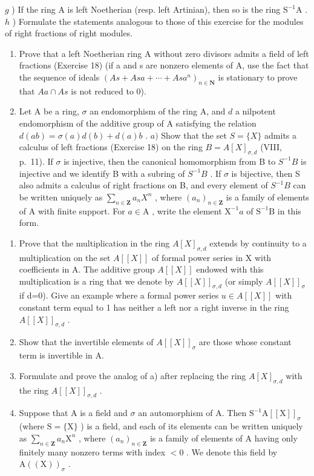 \(g\) ) If the ring A is left Noetherian (resp. left Artinian), then so is the ring \(\mathrm{S}^{-1}\mathrm{A}\) . \(h\) ) Formulate the statements analogous to those of this exercise for the modules of right fractions of right modules.

\begin{enumerate}
\def\labelenumi{\arabic{enumi})}
\setcounter{enumi}{19}
\item
  Prove that a left Noetherian ring A without zero divisors admits a field of left fractions (Exercise 18) (if a and s are nonzero elements of A, use the fact that the sequence of ideals \((As + Asa + \cdots + Asa^{n})_{n \in \mathbf{N}}\) is stationary to prove that \(Aa \cap As\) is not reduced to 0).
\item
  Let A be a ring, \(\sigma\) an endomorphism of the ring A, and \(d\) a nilpotent endomorphism of the additive group of A satisfying the relation \(d(ab) = \sigma(a)d(b) + d(a)b\) . \(a)\) Show that the set \(S = \{X\}\) admits a calculus of left fractions (Exercise 18) on the ring \(B = A[X]_{\sigma,d}\) (VIII, p.~11). If \(\sigma\) is injective, then the canonical homomorphism from B to \(S^{-1}B\) is injective and we identify B with a subring of \(S^{-1}B\) . If \(\sigma\) is bijective, then S also admits a calculus of right fractions on B, and every element of \(S^{-1}B\) can be written uniquely as \(\sum_{n\in\mathbf{Z}}a_nX^n\) , where \((a_n)_{n\in\mathbf{Z}}\) is a family of elements of A with finite support. For \(a \in \mathrm{A}\) , write the element \(\mathrm{X}^{-1}a\) of \(\mathrm{S}^{-1}\mathrm{B}\) in this form.
\end{enumerate}

\begin{enumerate}
\def\labelenumi{\alph{enumi})}
\setcounter{enumi}{1}
\item
  Prove that the multiplication in the ring \(A[X]_{\sigma,d}\) extends by continuity to a multiplication on the set \(A[[X]]\) of formal power series in X with coefficients in A. The additive group \(A[[X]]\) endowed with this multiplication is a ring that we denote by \(A[[X]]_{\sigma,d}\) (or simply \(A[[X]]_{\sigma}\) if d=0). Give an example where a formal power series \(u\in A[[X]]\) with constant term equal to 1 has neither a left nor a right inverse in the ring \(A[[X]]_{\sigma,d}\) .
\item
  Show that the invertible elements of \(A[[X]]_{\sigma}\) are those whose constant term is invertible in A.
\item
  Formulate and prove the analog of a) after replacing the ring \(A[X]_{\sigma,d}\) with the ring \(A[[X]]_{\sigma,d}\) .
\item
  Suppose that A is a field and \(\sigma\) an automorphism of A. Then \(\mathrm{S}^{-1}\mathrm{A}[[\mathrm{X}]]_{\sigma}\) (where \(\mathrm{S} = \{\mathrm{X}\}\) ) is a field, and each of its elements can be written uniquely as \(\sum_{n\in \mathbf{Z}}a_n\mathrm{X}^n\) , where \((a_{n})_{n\in \mathbf{Z}}\) is a family of elements of A having only finitely many nonzero terms with index \(< 0\) . We denote this field by \(\mathrm{A}((\mathrm{X}))_{\sigma}\) .
\end{enumerate}


